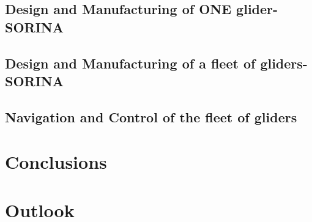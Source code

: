 \documentclass[]{iac}
\begin{document}
\subsection{Design and Manufacturing of ONE glider-SORINA}

\subsection{Design and Manufacturing of a fleet of gliders-SORINA}

\subsection{Navigation and Control of the fleet of gliders}


\section{Conclusions}
\section{Outlook}
\end{document}
